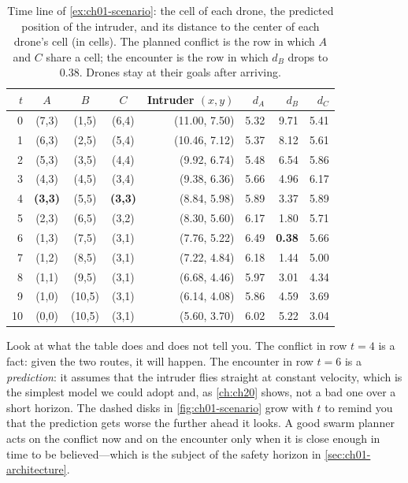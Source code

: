 \begin{table}[tb]
  \centering\small
  \caption{Time line of \cref{ex:ch01-scenario}: the cell of each drone, the predicted
    position of the intruder, and its distance to the center of each drone's cell (in
    cells). The planned conflict is the row in which $A$ and $C$ share a cell; the
    encounter is the row in which $d_B$ drops to $0.38$. Drones stay at their goals
    after arriving.}
  \label{tab:ch01-trace}
  \begin{tabular}{@{}rcccrrrr@{}}
  \toprule
  $t$ & $A$ & $B$ & $C$ & Intruder $(x,y)$ & $d_A$ & $d_B$ & $d_C$\\
  \midrule
  0 & (7,3) & (1,5) & (6,4) & (11.00, 7.50) & 5.32 & 9.71 & 5.41\\
  1 & (6,3) & (2,5) & (5,4) & (10.46, 7.12) & 5.37 & 8.12 & 5.61\\
  2 & (5,3) & (3,5) & (4,4) & (9.92, 6.74) & 5.48 & 6.54 & 5.86\\
  3 & (4,3) & (4,5) & (3,4) & (9.38, 6.36) & 5.66 & 4.96 & 6.17\\
  4 & \textbf{(3,3)} & (5,5) & \textbf{(3,3)} & (8.84, 5.98) & 5.89 & 3.37 & 5.89\\
  5 & (2,3) & (6,5) & (3,2) & (8.30, 5.60) & 6.17 & 1.80 & 5.71\\
  6 & (1,3) & (7,5) & (3,1) & (7.76, 5.22) & 6.49 & \textbf{0.38} & 5.66\\
  7 & (1,2) & (8,5) & (3,1) & (7.22, 4.84) & 6.18 & 1.44 & 5.00\\
  8 & (1,1) & (9,5) & (3,1) & (6.68, 4.46) & 5.97 & 3.01 & 4.34\\
  9 & (1,0) & (10,5) & (3,1) & (6.14, 4.08) & 5.86 & 4.59 & 3.69\\
  10 & (0,0) & (10,5) & (3,1) & (5.60, 3.70) & 6.02 & 5.22 & 3.04\\
  \bottomrule
  \end{tabular}
\end{table}

Look at what the table does and does not tell you. The conflict in row $t=4$ is a
fact: given the two routes, it will happen. The encounter in row $t=6$ is a
\emph{prediction}: it assumes that the intruder flies straight at constant velocity,
which is the simplest model we could adopt and, as \cref{ch:ch20} shows, not a bad one
over a short horizon. The dashed disks in \cref{fig:ch01-scenario} grow with $t$ to
remind you that the prediction gets worse the further ahead it looks. A good swarm
planner acts on the conflict now and on the encounter only when it is close enough in
time to be believed---which is the subject of the safety horizon in
\cref{sec:ch01-architecture}.

